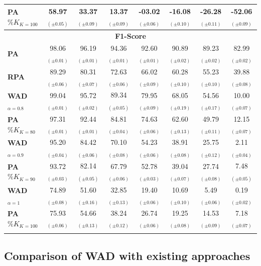 \begin{table}[!t]
\begin{tabular*}{\hsize}{@{\extracolsep{\fill}} lccccccc}
    \bf PA$\%K_{K=100}$ & 58.97$_{(\pm0.05)}$ & 33.37$_{(\pm0.09)}$ & 13.37$_{(\pm0.09)}$ & -03.02$_{(\pm0.06)}$ & -16.08$_{(\pm0.10)}$ & -26.28$_{(\pm0.11)}$ & -52.06$_{(\pm0.09)}$ \\
    \midrule
    \multicolumn{8}{c}{\bf F1-Score} \\
    \midrule
    \bf PA & 98.06$_{(\pm0.01)}$ & 96.19$_{(\pm0.01)}$ & 94.36$_{(\pm0.01)}$ & 92.60$_{(\pm0.01)}$ & 90.89$_{(\pm0.02)}$ & 89.23$_{(\pm0.02)}$ & 82.99$_{(\pm0.02)}$ \\
    \bf RPA & 89.29$_{(\pm0.06)}$ & 80.31$_{(\pm0.07)}$ & 72.63$_{(\pm0.06)}$ & 66.02$_{(\pm0.09)}$ & 60.28$_{(\pm0.10)}$ & 55.23$_{(\pm0.10)}$ & 39.88$_{(\pm0.08)}$ \\
    \bf WAD$_{\alpha=0.8}$ & 99.04$_{(\pm0.01)}$ & 95.72$_{(\pm0.02)}$ & 89.34$_{(\pm0.05)}$ & 79.95$_{(\pm0.09)}$ & 68.05$_{(\pm0.19)}$ & 54.56$_{(\pm0.17)}$ & 10.00$_{(\pm0.07)}$ \\
    \bf PA$\%K_{K=80}$ & 97.31$_{(\pm0.01)}$ & 92.44$_{(\pm0.01)}$ & 84.81$_{(\pm0.04)}$ & 74.63$_{(\pm0.06)}$ & 62.60$_{(\pm0.13)}$ & 49.79$_{(\pm0.11)}$ & 12.15$_{(\pm0.07)}$ \\
    \bf WAD$_{\alpha=0.9}$ & 95.20$_{(\pm0.04)}$ & 84.42$_{(\pm0.06)}$ & 70.10$_{(\pm0.08)}$ & 54.23$_{(\pm0.06)}$ & 38.91$_{(\pm0.08)}$ & 25.75$_{(\pm0.12)}$ & 2.11$_{(\pm0.04)}$ \\
    \bf PA$\%K_{K=90}$ & 93.72$_{(\pm0.03)}$ & 82.14$_{(\pm0.05)}$ & 67.79$_{(\pm0.06)}$ & 52.78$_{(\pm0.03)}$ & 39.04$_{(\pm0.07)}$ & 27.74$_{(\pm0.08)}$ & 7.48$_{(\pm0.05)}$ \\
    \bf WAD$_{\alpha=1}$ & 74.89$_{(\pm0.08)}$ & 51.60$_{(\pm0.16)}$ & 32.85$_{(\pm0.13)}$ & 19.40$_{(\pm0.06)}$ & 10.69$_{(\pm0.10)}$ & 5.49$_{(\pm0.06)}$ & 0.19$_{(\pm0.02)}$ \\
    \bf PA$\%K_{K=100}$ & 75.93$_{(\pm0.06)}$ & 54.66$_{(\pm0.13)}$ & 38.24$_{(\pm0.12)}$ & 26.74$_{(\pm0.06)}$ & 19.25$_{(\pm0.08)}$ & 14.53$_{(\pm0.09)}$ & 7.18$_{(\pm0.07)}$ \\
    \addlinespace
    \bottomrule
    \end{tabular*}
\end{table}




\subsection{Comparison of WAD with existing approaches}\label{wad_metrics}

